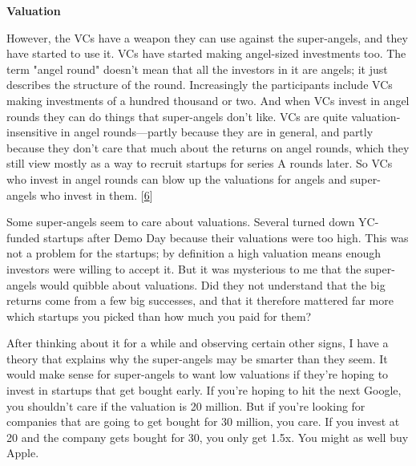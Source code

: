 \textbf{Valuation}

However, the
                    VCs have a weapon they can use against the super-angels, and
                    they have started to use it. VCs have started making
                    angel-sized investments too. The term "angel round" doesn't
                    mean that all the investors in it are angels; it just
                    describes the structure of the round. Increasingly the
                    participants include VCs making investments of a hundred
                    thousand or two. And when VCs invest in angel rounds they
                    can do things that super-angels don't like. VCs are quite
                    valuation-insensitive in angel rounds---partly because
                    they are in general, and partly because they don't care that
                    much about the returns on angel rounds, which they still
                    view mostly as a way to recruit startups for series A rounds
                    later. So VCs who invest in angel rounds can blow up the
                    valuations for angels and super-angels who invest in them.
                    [\href{\#f6n}{6}]

Some super-angels seem to care about
                    valuations. Several turned down YC-funded startups after
                    Demo Day because their valuations were too high. This was
                    not a problem for the startups; by definition a high
                    valuation means enough investors were willing to accept it.
                    But it was mysterious to me that the super-angels would
                    quibble about valuations. Did they not understand that the
                    big returns come from a few big successes, and that it
                    therefore mattered far more which startups you picked than
                    how much you paid for them?

After thinking about
                    it for a while and observing certain other signs, I have a
                    theory that explains why the super-angels may be smarter
                    than they seem. It would make sense for super-angels to want
                    low valuations if they're hoping to invest in startups that
                    get bought early. If you're hoping to hit the next Google,
                    you shouldn't care if the valuation is 20 million. But if
                    you're looking for companies that are going to get bought
                    for 30 million, you care. If you invest at 20 and the
                    company gets bought for 30, you only get 1.5x. You might as
                    well buy Apple.

